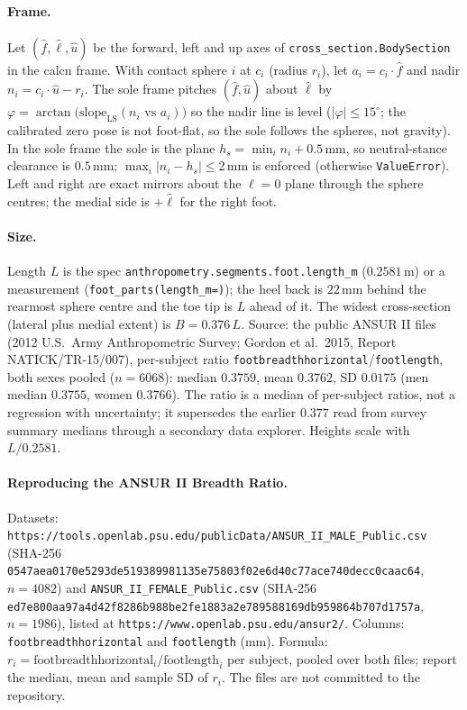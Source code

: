 \paragraph{Frame.} Let $(\hat f,\hat\ell,\hat u)$ be the forward, left and up
axes of \texttt{cross\_section.BodySection} in the calcn frame. With contact
sphere $i$ at $c_i$ (radius $r_i$), let $a_i=c_i\!\cdot\!\hat f$ and nadir
$n_i=c_i\!\cdot\!\hat u-r_i$. The sole frame pitches $(\hat f,\hat u)$ about
$\hat\ell$ by $\varphi=\arctan\bigl(\mathrm{slope}_{\mathrm{LS}}(n_i\text{ vs }a_i)\bigr)$
so the nadir line is level ($|\varphi|\le15^\circ$; the calibrated zero pose is
not foot-flat, so the sole follows the spheres, not gravity). In the sole frame
the sole is the plane $h_s=\min_i n_i + 0.5$\,mm, so neutral-stance clearance
is $0.5$\,mm; $\max_i|n_i-h_s|\le 2$\,mm is enforced (otherwise
\texttt{ValueError}). Left and right are exact mirrors about the $\ell=0$ plane
through the sphere centres; the medial side is $+\hat\ell$ for the right foot.

\paragraph{Size.} Length $L$ is the spec
\texttt{anthropometry.segments.foot.length\_m} ($0.2581$\,m) or a measurement
(\texttt{foot\_parts(length\_m=)}); the heel back is $22$\,mm behind the
rearmost sphere centre and the toe tip is $L$ ahead of it. The widest
cross-section (lateral plus medial extent) is $B=0.376\,L$. Source: the public
ANSUR II files (2012 U.S.\ Army Anthropometric Survey; Gordon et al.\ 2015,
Report NATICK/TR-15/007), per-subject ratio \texttt{footbreadthhorizontal}/\texttt{footlength},
both sexes pooled ($n=6068$): median $0.3759$, mean $0.3762$, SD $0.0175$
(men median $0.3755$, women $0.3766$). The ratio is a median of per-subject
ratios, not a regression with uncertainty; it supersedes the earlier
$0.377$ read from survey summary medians through a secondary data explorer.
Heights scale with $L/0.2581$.

\paragraph{Reproducing the ANSUR II Breadth Ratio.}
Datasets: \texttt{https://tools.openlab.psu.edu/publicData/ANSUR\_II\_MALE\_Public.csv}
(SHA-256 \texttt{0547aea0170e5293de519389981135e75803f02e6d40c77ace740decc0caac64},
$n=4082$) and \texttt{ANSUR\_II\_FEMALE\_Public.csv} (SHA-256
\texttt{ed7e800aa97a4d42f8286b988be2fe1883a2e789588169db959864b707d1757a},
$n=1986$), listed at \texttt{https://www.openlab.psu.edu/ansur2/}. Columns:
\texttt{footbreadthhorizontal} and \texttt{footlength} (mm). Formula:
$r_i=\mathrm{footbreadthhorizontal}_i/\mathrm{footlength}_i$ per subject, pooled over
both files; report the median, mean and sample SD of $r_i$. The files are not
committed to the repository.

